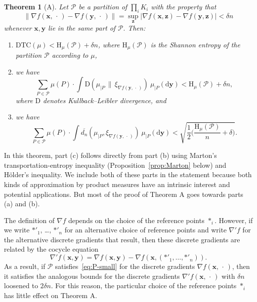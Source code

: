 \documentclass[aop,preprint]{imsart}
\newtheorem*{thm*}{Theorem}
\theoremstyle{remark}
\renewcommand{\bf}[1]{\boldsymbol{#1}}
\renewcommand{\cal}[1]{\mathcal{#1}}
\newcommand{\rmH}{\mathrm{H}}
\renewcommand{\d}{\mathrm{d}}
\renewcommand{\P}{\mathcal{P}}
\newcommand{\ol}[1]{\overline{#1}}
\newcommand{\DTC}{\mathrm{DTC}}
\newcommand{\rmD}{\mathrm{D}}
\begin{document}
\begin{thm*}[A]
 Let $\cal{P}$ be a partition of $\prod_i K_i$ with the property that
\begin{equation}\label{eq:P-small}
	\|\nabla f(\bf{x},\,\cdot\,) - \nabla f(\bf{y},\,\cdot\,)\| = \sup_{\bf{z}}|\nabla f(\bf{x},\bf{z}) - \nabla f(\bf{y},\bf{z})| < \delta n
	\end{equation}
	whenever $\bf{x},\bf{y}$ lie in the same part of $\cal{P}$. Then:
	\begin{enumerate}
		\item[a)] $\DTC(\mu) < \rmH_\mu(\P) + \delta n$, where $\rmH_\mu(\P)$ is the Shannon entropy of the partition $\P$ according to $\mu$,
		\item[b)] we have
		\[\sum_{P\in \cal{P}}\mu(P)\cdot \int \rmD(\mu_{|P}\,\|\,\xi_{\nabla f(\bf{y},\,\cdot\,)})\ \mu_{|P}(\d \bf{y}) < \rmH_\mu(\cal{P}) + \delta n,\]
		where $\rmD$ denotes Kullback--Leibler divergence, and
		\item[c)] we have
		\[\sum_{P\in \cal{P}}\mu(P)\cdot \int \ol{d_n}(\mu_{|P},\xi_{\nabla f(\bf{y},\,\cdot\,)})\ \mu_{|P}(\d \bf{y}) < \sqrt{\frac{1}{2}\Big(\frac{\rmH_\mu(\cal{P})}{n} + \delta\Big)}.\]
	\end{enumerate}
\end{thm*}

In this theorem, part (c) follows directly from part (b) using Marton's transportation-entropy inequality (Proposition~\ref{prop:Marton} below) and H\"older's inequality.  We include both of these parts in the statement because both kinds of approximation by product measures have an intrinsic interest and potential applications.  But most of the proof of Theorem A goes towards parts (a) and (b).

The definition of $\nabla f$ depends on the choice of the reference points $\ast_i$.  However, if we write $\ast'_1$, \dots, $\ast'_n$ for an alternative choice of reference points and write $\nabla'f$ for the alternative discrete gradients that result, then these discrete gradients are related by the cocycle equation
\[\nabla'f(\bf{x},\bf{y}) = \nabla f(\bf{x},\bf{y}) - \nabla f(\bf{x},(\ast'_1,\dots,\ast'_n)).\]
As a result, if $\P$ satisfies~\eqref{eq:P-small} for the discrete gradients $\nabla f(\bf{x},\,\cdot\,)$, then it satisfies the analogous bounds for the discrete gradients $\nabla' f(\bf{x},\,\cdot\,)$ with $\delta n$ loosened to $2\delta n$.  For this reason, the particular choice of the reference points $\ast_i$ has little effect on Theorem A.
\end{document}
